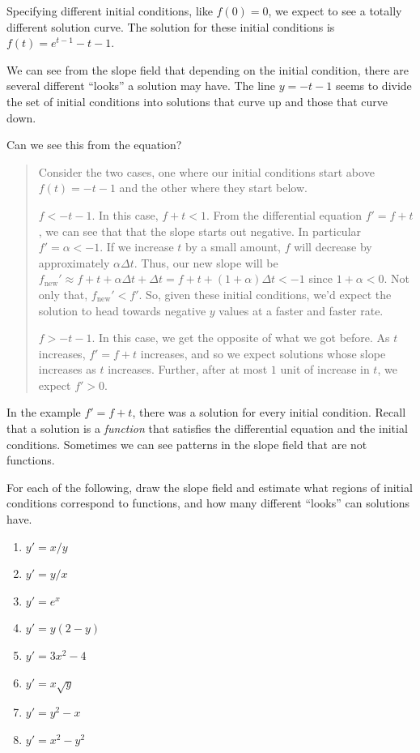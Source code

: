 \documentclass{problemset}
\begin{document}
	Specifying different initial conditions, like $f(0)=0$, we expect to see a totally different solution curve.
	The solution for these initial conditions is $f(t)=e^{t-1}-t-1$.

	We can see from the slope field that depending on the initial condition, there are several different
	``looks'' a solution may have.  The line $y=-t-1$ seems to divide the set of initial
	conditions into solutions that curve up and those that curve down.

	Can we see this from the equation?

	\begin{quote}
		Consider the two cases, one where our initial conditions start above $f(t)=-t-1$
		and the other where they start below.

		$f < -t -1$.  In this case, $f+t<1$.  From the differential equation $f'=f+t$, we can see that that the slope
		starts out negative.  In particular $f'=\alpha <-1$.  If we increase $t$ by a small amount, $f$ will decrease 
		by approximately $\alpha \Delta t$.  Thus, our new slope will be $f_{\text{new}}'
		\approx f+t+\alpha \Delta t+\Delta t = f+t+(1+\alpha)\Delta t< -1$ since $1+\alpha < 0$.  Not only that, 
		$f_{\text{new}}' < f'$.  So, given these initial conditions, we'd expect the solution to head towards
		negative $y$ values at a faster and faster rate.

		$f > -t-1$.  In this case, we get the opposite of what we got before.  As $t$ increases, $f'=f+t$
		increases, and so we expect solutions whose slope increases as $t$ increases.  Further, after 
		at most $1$ unit of increase in $t$, we expect $f'>0$.
	\end{quote}

	In the example $f' =f+t$, there was a solution for every initial condition.  Recall that a
	solution is a \emph{function} that satisfies the differential equation and the initial conditions.
	Sometimes we can see patterns in the slope field that are not functions.

	For each of the following, draw the slope field and estimate what regions of initial conditions
	correspond to functions, and how many different ``looks'' can solutions have.
	\begin{enumerate}
		\item $y'=x/y$
		\item $y'=y/x$
		\item $y'=e^x$
		\item $y'=y(2-y)$
		\item $y'=3x^2-4$
		\item $y'=x\sqrt{y}$
		\item $y'=y^2-x$
		\item $y'=x^2-y^2$
	\end{enumerate}
\end{document}
